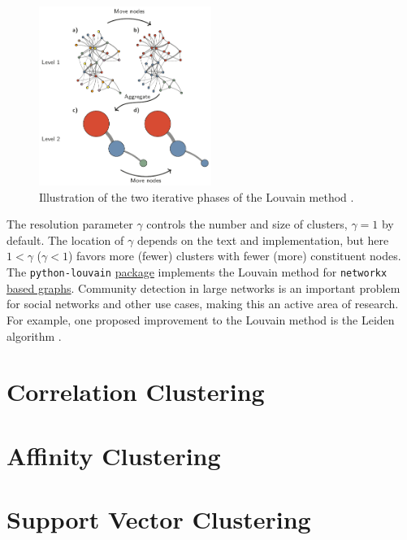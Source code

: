 \begin{figure}
\centering
\includegraphics[width=0.5\textwidth]{figures/ml/louvain_algo}
\caption{
Illustration of the two iterative phases of the Louvain method \cite{leiden}.
}
\label{fig:louvain}
\end{figure}

The resolution parameter $\gamma$ controls the number and size of clusters, $\gamma =1$ by default.
The location of $\gamma$ depends on the text and implementation,
but here $1 < \gamma$ ($\gamma < 1$) favors more (fewer) clusters with fewer (more) constituent nodes.
The \texttt{python-louvain}
\href{https://python-louvain.readthedocs.io/en/latest/}{package} \cite{python-louvain}
implements the Louvain method for \texttt{networkx} \cite{networkx}
\href{https://networkx.org/}{based graphs}.
Community detection in large networks is an important problem for social networks and other use cases,
making this an active area of research.
For example, one proposed improvement to the Louvain method is the Leiden algorithm \cite{leiden}.

\section{Correlation Clustering}
\label{cluster:correlation}

\section{Affinity Clustering}
\label{cluster:affinity}

\section{Support Vector Clustering}
\label{cluster:SVC}

